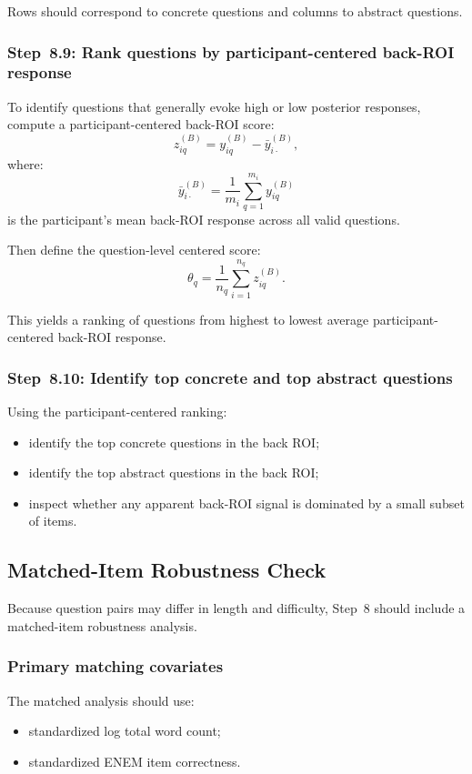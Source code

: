 \documentclass[11pt]{article}
\begin{document}
Rows should correspond to concrete questions and columns to abstract questions.

\subsubsection{Step~8.9: Rank questions by participant-centered back-ROI response}
To identify questions that generally evoke high or low posterior responses,
compute a participant-centered back-ROI score:
\begin{equation}
z^{(B)}_{iq}
=
y^{(B)}_{iq}
-
\bar{y}^{(B)}_{i\cdot},
\end{equation}
where:
\begin{equation}
\bar{y}^{(B)}_{i\cdot}
=
\frac{1}{m_i}
\sum_{q=1}^{m_i} y^{(B)}_{iq}
\end{equation}
is the participant's mean back-ROI response across all valid questions.

Then define the question-level centered score:
\begin{equation}
\theta_q
=
\frac{1}{n_q}
\sum_{i=1}^{n_q} z^{(B)}_{iq}.
\end{equation}

This yields a ranking of questions from highest to lowest average participant-centered back-ROI response.

\subsubsection{Step~8.10: Identify top concrete and top abstract questions}
Using the participant-centered ranking:
\begin{itemize}
    \item identify the top concrete questions in the back ROI;
    \item identify the top abstract questions in the back ROI;
    \item inspect whether any apparent back-ROI signal is dominated by a small subset of items.
\end{itemize}

\subsection{Matched-Item Robustness Check}
Because question pairs may differ in length and difficulty, Step~8 should include a matched-item robustness analysis.

\subsubsection{Primary matching covariates}
The matched analysis should use:
\begin{itemize}
    \item standardized log total word count;
    \item standardized ENEM item correctness.
\end{itemize}
\end{document}
